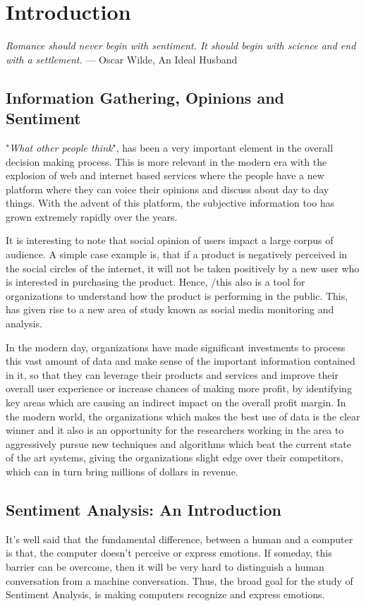 \chapter{Introduction}\label{chapter:introduction}
\begin{center}
\textit{Romance should never begin with sentiment. It should begin with science and end with a settlement.}
— Oscar Wilde, An Ideal Husband
\end{center}

\section{Information Gathering, Opinions and Sentiment}
"\textit{What other people think}", has been a very important element in the overall decision making process. This is more relevant in the modern era with the explosion of web and internet based services where the people have a new platform where they can voice their opinions and discuss about day to day things. With the advent of this platform, the subjective information too has grown extremely rapidly over the years.  
\newline

It is interesting to note that social opinion of users impact a large corpus of audience. A simple case example is, that if a product is negatively perceived in the social circles of the internet, it will not be taken positively by a new user who is interested in purchasing the product. Hence, /this also is a tool for organizations to understand how the product is performing in the public. This, has given rise to a new area of study known as social media monitoring and analysis. 
\newline

In the modern day, organizations have made significant investments to process this vast amount of data and make sense of the important information contained in it, so that they can leverage their products and services and improve their overall user experience or increase chances of making more profit, by identifying key areas which are causing an indirect impact on the overall profit margin. In the modern world, the organizations which makes the best use of data is the clear winner and it also is an opportunity for the researchers working in the area to aggressively pursue new techniques and algorithms which beat the current state of the art systems, giving the organizations slight edge over their competitors, which can in turn bring millions of dollars in revenue.      
\section{Sentiment Analysis: An Introduction}
It's well said that the fundamental difference, between a human and a computer is that, the computer doesn't perceive or express emotions. If someday, this barrier can be overcome, then it will be very hard to distinguish a human conversation  from a machine conversation. Thus, the broad goal for the study of Sentiment Analysis, is making computers recognize and express emotions.  

